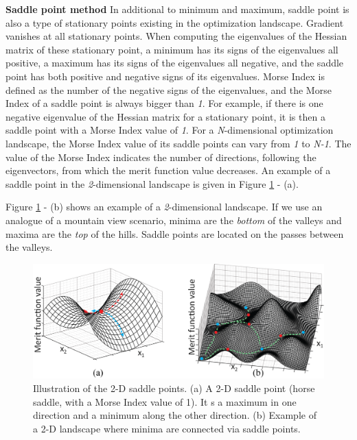\textbf{Saddle point method}
In additional to minimum and maximum, saddle point is also a type of stationary points existing in the optimization landscape. Gradient vanishes at all stationary points. When computing the eigenvalues of the Hessian matrix of these stationary point, a minimum has its signs of the eigenvalues all positive, a maximum has its signs of the eigenvalues all negative, and the saddle point has both positive and negative signs of its eigenvalues. Morse Index is defined as the number of the negative signs of the eigenvalues, and the Morse Index of a saddle point is always bigger than \textit{1}. For example, if there is one negative eigenvalue of the Hessian matrix for a stationary point, it is then a saddle point with a Morse Index value of \textit{1}. For a \textit{N}-dimensional optimization landscape, the Morse Index value of its saddle points can vary from \textit{1} to \textit{N-1}.  The value of the Morse Index indicates the number of directions, following the eigenvectors, from which the merit function value decreases. An example of a saddle point in the \textit{2}-dimensional landscape is given in Figure \ref{fig: saddle_illustration} - (a). 

Figure \ref{fig: saddle_illustration} - (b) shows an example of a \textit{2}-dimensional landscape. If we use an analogue of a mountain view scenario, minima are the \textit{bottom} of the valleys and maxima are the \textit{top} of the hills. Saddle points are located on the passes between the valleys. 

\begin{figure}
    \centering
    \includegraphics[scale=0.58]{chapter-1/figures/saddle_point_plotted.png}
    \caption{Illustration of the 2-D saddle points. (a) A 2-D saddle point (horse saddle, with a Morse Index value of 1). It s a maximum in one direction and a minimum along the other direction. (b) Example of a 2-D landscape where minima are connected via saddle points. }
    \label{fig: saddle_illustration}
\end{figure} 

